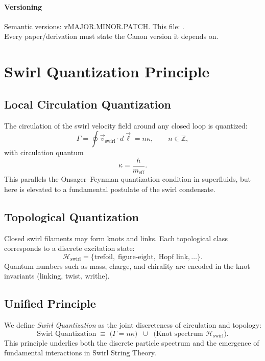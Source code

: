 \documentclass[11pt]{article}
\begin{document}
		\vfill
		\paragraph{Versioning} Semantic versions: vMAJOR.MINOR.PATCH. This file: \canonversion.\\
		Every paper/derivation must state the Canon version it depends on.
		\titlepageClose
    \section{Swirl Quantization Principle}

    \subsection{Local Circulation Quantization}
    The circulation of the swirl velocity field around any closed loop is quantized:
    \begin{equation}
        \Gamma = \oint \vec{v}_{\text{swirl}} \cdot d\vec{\ell}
        = n \kappa,
        \qquad n \in \mathbb{Z},
    \end{equation}
    with circulation quantum
    \begin{equation}
        \kappa = \frac{h}{m_\text{eff}}.
    \end{equation}
    This parallels the Onsager--Feynman quantization condition in superfluids, but here is elevated to a fundamental postulate of the swirl condensate.

    \subsection{Topological Quantization}
    Closed swirl filaments may form knots and links. Each topological class corresponds to a discrete excitation state:
    \begin{equation}
        \mathcal{H}_\text{swirl}
        = \{ \text{trefoil}, \; \text{figure-eight}, \; \text{Hopf link}, \dots \}.
    \end{equation}
    Quantum numbers such as mass, charge, and chirality are encoded in the knot invariants (linking, twist, writhe).

    \subsection{Unified Principle}
    We define \emph{Swirl Quantization} as the joint discreteness of circulation and topology:
    \[
        \text{Swirl Quantization} \;\equiv\;
        \Big( \Gamma = n\kappa \Big)
        \;\; \cup \;\;
        \Big( \text{Knot spectrum } \mathcal{H}_\text{swirl} \Big).
    \]
    This principle underlies both the discrete particle spectrum and the emergence of fundamental interactions in Swirl String Theory.
\end{document}
